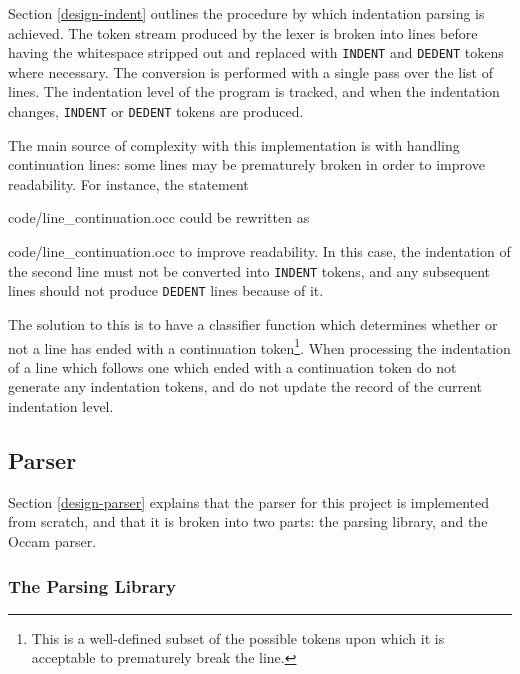 Section \ref{design-indent} outlines the procedure by which indentation parsing
is achieved. The token stream produced by the lexer is broken into lines before
having the whitespace stripped out and replaced with \texttt{INDENT} and
\texttt{DEDENT} tokens where necessary. The conversion is performed with a
single pass over the list of lines. The indentation level of the program is
tracked, and when the indentation changes, \texttt{INDENT} or \texttt{DEDENT}
tokens are produced.

The main source of complexity with this implementation is with handling
continuation lines: some lines may be prematurely broken in order to improve
readability. For instance, the statement

    {code/line_continuation.occ}
could be rewritten as

    {code/line_continuation.occ}
to improve readability. In this case, the indentation of the second line must
not be converted into \texttt{INDENT} tokens, and any subsequent lines should
not produce \texttt{DEDENT} lines because of it.

The solution to this is to have a classifier function which determines whether
or not a line has ended with a continuation token\footnote{This is a
well-defined subset of the possible tokens upon which it is acceptable to
prematurely break the line.}. When processing the indentation of a line which
follows one which ended with a continuation token do not generate any
indentation tokens, and do not update the record of the current indentation
level.

\subsection{Parser}

Section \ref{design-parser} explains that the parser for this project is
implemented from scratch, and that it is broken into two parts: the parsing
library, and the Occam parser.

\subsubsection{The Parsing Library}

